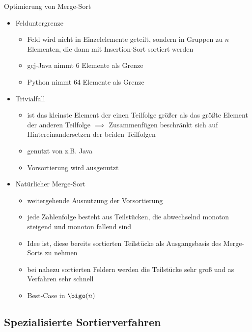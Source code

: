 \begin{defi}{Optimierung von Merge-Sort}
    \begin{itemize}
        \item Felduntergrenze
              \begin{itemize}
                  \item Feld wird nicht in Einzelelemente geteilt, sondern in Gruppen zu $n$ Elementen, die dann mit Insertion-Sort sortiert werden
                  \item gcj-Java nimmt 6 Elemente als Grenze
                  \item Python nimmt 64 Elemente als Grenze
              \end{itemize}
        \item Trivialfall
              \begin{itemize}
                  \item ist das kleinste Element der einen Teilfolge größer als das größte Element der anderen Teilfolge $\implies$ Zusammenfügen beschränkt sich auf Hintereinandersetzen der beiden Teilfolgen
                  \item genutzt von z.B. Java
                  \item Vorsortierung wird ausgenutzt
              \end{itemize}
        \item Natürlicher Merge-Sort
              \begin{itemize}
                  \item weitergehende Ausnutzung der Vorsortierung
                  \item jede Zahlenfolge besteht aus Teilstücken, die abwechselnd monoton steigend und monoton fallend sind
                  \item Idee ist, diese bereits sortierten Teilstücke als Ausgangsbasis des Merge-Sorts zu nehmen
                  \item bei nahezu sortierten Feldern werden die Teilstücke sehr groß und as Verfahren sehr schnell
                  \item Best-Case in $\bigo(n)$
              \end{itemize}
    \end{itemize}
\end{defi}

\subsection{Spezialisierte Sortierverfahren}

